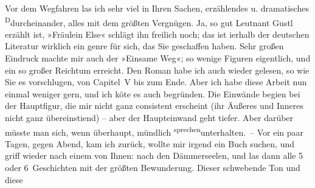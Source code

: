 \begin{ledgroupsized}[t]{13cm}
           \pstart
           Vor dem Wegfahren las ich sehr viel in Ihren Sachen, erzählendes u. dramatisches \substVorne{}\textsuperscript{D}\substDazwischen{}d\substHinten{}urcheinander, alles mit dem größten Vergnügen. Ja, so gut Leutnant Gustl erzählt ist, »Fräulein Else« schlägt ihn freilich noch; das ist i{\geminationn}erhalb der deutschen Literatur wirklich ein genre für
               sich, das Sie geschaffen haben. Sehr großen Eindruck machte mir auch der »Einsame Weg«; so wenige Figuren eigentlich, und ein
               so großer Reichtum erreicht. Den Roman habe ich {\pb}auch
               wieder gelesen, so wie Sie es vorschlugen, von Capitel V bis zum Ende. Aber ich habe
               diese Arbeit nun einmal weniger gern, und ich kö{\geminationn}te es
               auch begründen. Die Einwände begi{\geminationn}en bei der Hauptfigur,
               die mir nicht ganz consistent erscheint (ihr Äußeres und Inneres nicht ganz
                  übereinsti{\geminationm}end) – aber der Haupteinwand geht tiefer.
               Aber darüber müsste man sich, wenn überhaupt, mündlich \substVorne{}\textsuperscript{sprechen}{\allowbreak}\substDazwischen{}unterhalten\substHinten{}. – Vor ein paar Tagen, gegen Abend, kam ich zurück, wollte \introOben{}mir\introOben{} irgend ein Buch suchen, und griff wieder nach einem von
               Ihnen: nach den Dämmerseelen, und las dann alle 5
               oder 6 Geschichten mit der größten Bewunderung. Dieser schwebende Ton und diese

\end{ledgroupsized}
